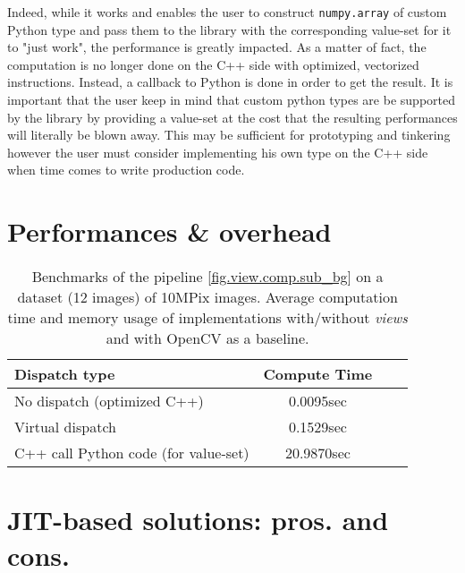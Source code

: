 Indeed, while it works and enables the user to construct \texttt{numpy.array} of custom Python type and pass them to the
library with the corresponding value-set for it to "just work", the performance is greatly impacted. As a matter of
fact, the computation is no longer done on the C++ side with optimized, vectorized instructions. Instead, a callback to
Python is done in order to get the result. It is important that the user keep in mind that custom python types are be
supported by the library by providing a value-set at the cost that the resulting performances will literally be blown
away. This may be sufficient for prototyping and tinkering however the user must consider implementing his own type on
the C++ side when time comes to write production code.

\section{Performances \& overhead}

\begin{table}
  \begin{tabular}{l|ccc}
    \toprule
    Dispatch type                        & Compute Time \\ \midrule
    No dispatch (optimized C++)          & 0.0095sec    \\
    Virtual dispatch                     & 0.1529sec    \\
    C++ call Python code (for value-set) & 20.9870sec   \\
    \bottomrule
  \end{tabular}
  \caption{Benchmarks of the pipeline \cref{fig.view.comp.sub_bg} on a dataset (12 images) of 10MPix images. Average
    computation time and memory usage of implementations with/without \emph{views} and with OpenCV as a baseline.}
  \label{table:static.dynamic.perfs}
\end{table}

\section{JIT-based solutions: pros. and cons.}

